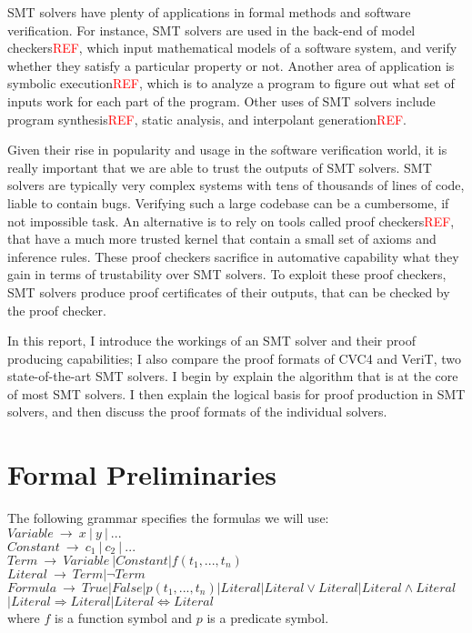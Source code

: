 \documentclass{article}
\begin{document}
SMT solvers have plenty of applications in formal methods 
and software verification. For instance, SMT solvers are used 
in the back-end of model checkers\textcolor{red}{REF}, which input mathematical 
models of a software system, and verify whether they 
satisfy a particular property or not. Another area of 
application is symbolic execution\textcolor{red}{REF}, which is to analyze a 
program to figure out what set of inputs work for each 
part of the program. Other uses of SMT solvers include 
program synthesis\textcolor{red}{REF}, static analysis, 
and interpolant generation\textcolor{red}{REF}.

Given their rise in popularity and usage in the software 
verification world, it is really important that we are able 
to trust the outputs of SMT solvers. SMT solvers are typically 
very complex systems with tens of thousands of lines of code, 
liable to contain bugs. Verifying such a large codebase can 
be a cumbersome, if not impossible task. An alternative is 
to rely on tools called proof checkers\textcolor{red}{REF}, 
that have a much more trusted kernel that contain a small 
set of axioms and inference rules. These proof checkers 
sacrifice in automative capability what they gain in terms 
of trustability over SMT solvers. To exploit these proof 
checkers, SMT solvers produce proof certificates of their 
outputs, that can be checked by the proof checker.

In this report, I introduce the workings of an SMT solver 
and their proof producing capabilities; I also compare the 
proof formats of CVC4 and VeriT, two state-of-the-art SMT solvers. I begin by explain the algorithm that is at the core 
of most SMT solvers. I then explain the logical basis for 
proof production in SMT solvers, and then discuss the proof 
formats of the individual solvers.


\section{Formal Preliminaries}
The following grammar specifies the formulas we will use: \\ 
$Variable\ \rightarrow\ x\ |\ y\ |\ ... $ \\
$Constant\ \rightarrow\ c_1\ |\ c_2\ |\ ... $ \\
$Term\ \rightarrow\ Variable\ | Constant | f(t_1, ..., t_n)$ \\
$Literal\ \rightarrow\ Term | \neg Term$ \\
$Formula\ \rightarrow\ True | False | p(t_1, ..., t_n) | Literal | 
Literal \lor Literal | Literal \land Literal$ \\ 
$| Literal \Rightarrow Literal | Literal \iff Literal$ \\
where $f$ is a function symbol and $p$ is a predicate symbol.
\end{document}
